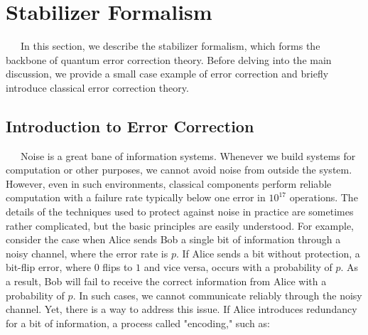 \documentclass[a4paper,11pt]{ltjsarticle}
\begin{document}
\section{Stabilizer Formalism }{
    \ \ \ In this section, we describe the stabilizer formalism\cite{nielsen2010}, which forms the backbone of quantum error correction theory. Before delving into the main discussion, we provide a small case example of error correction and briefly introduce classical error correction theory.
    \subsection{Introduction to Error Correction}\label{introduction_to_error_correction}{
        \ \ \ Noise is a great bane of information systems. Whenever we build systems for computation or other purposes, we cannot avoid noise from outside the system. However, even in such environments, classical components perform reliable computation with a failure rate typically below one error in $10^{17}$ operations. The details of the techniques used to protect against noise in practice are sometimes rather complicated, but the basic principles are easily understood. For example, consider the case when Alice sends Bob a single bit of information through a noisy channel, where the error rate is $p$. If Alice sends a bit without protection, a bit-flip error, where $0$ flips to $1$ and vice versa, occurs with a probability of $p$. As a result, Bob will fail to receive the correct information from Alice with a probability of $p$. In such cases, we cannot communicate reliably through the noisy channel. Yet, there is a way to address this issue. If Alice introduces redundancy for a bit of information, a process called "encoding," such as:

}}
\end{document}
